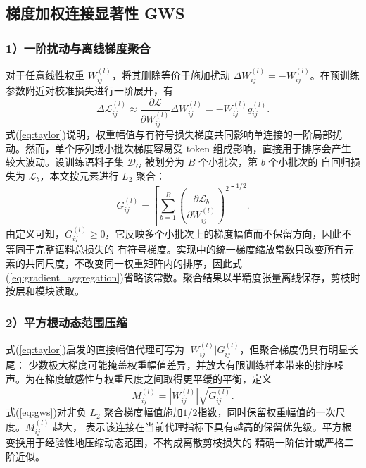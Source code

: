 \documentclass[UTF8,fontset=fandol]{ctexart}
\begin{document}
\subsection{梯度加权连接显著性 GWS}

\subsubsection*{1）一阶扰动与离线梯度聚合}

对于任意线性权重 $W_{ij}^{(l)}$，将其删除等价于施加扰动
$\Delta W_{ij}^{(l)}=-W_{ij}^{(l)}$。在预训练参数附近对校准损失进行一阶展开，有
\begin{equation}
\Delta\mathcal L_{ij}^{(l)}
\approx
\frac{\partial\mathcal L}{\partial W_{ij}^{(l)}}
\Delta W_{ij}^{(l)}
=-W_{ij}^{(l)}g_{ij}^{(l)} .
\label{eq:taylor}
\end{equation}
式(\ref{eq:taylor})说明，权重幅值与有符号损失梯度共同影响单连接的一阶局部扰动。然而，单个序列或小批次梯度容易受
token 组成影响，直接用于排序会产生较大波动。设训练语料子集 $\mathcal D_G$ 被划分为 $B$ 个小批次，第 $b$ 个小批次的
自回归损失为 $\mathcal L_b$，本文按元素进行 $L_2$ 聚合：
\begin{equation}
G_{ij}^{(l)}
=
\left[
\sum_{b=1}^{B}
\left(
\frac{\partial\mathcal L_b}{\partial W_{ij}^{(l)}}
\right)^2
\right]^{1/2}.
\label{eq:gradient_aggregation}
\end{equation}
由定义可知，$G_{ij}^{(l)}\geq0$，它反映多个小批次上的梯度幅值而不保留方向，因此不等同于完整语料总损失的
有符号梯度。实现中的统一梯度缩放常数只改变所有元素的共同尺度，不改变同一权重矩阵内的排序，因此式
(\ref{eq:gradient_aggregation})省略该常数。聚合结果以半精度张量离线保存，剪枝时按层和模块读取。

\subsubsection*{2）平方根动态范围压缩}

式(\ref{eq:taylor})启发的直接幅值代理可写为 $\lvert W_{ij}^{(l)}\rvert G_{ij}^{(l)}$，但聚合梯度仍具有明显长尾：
少数极大梯度可能掩盖权重幅值差异，并放大有限训练样本带来的排序噪声。为在梯度敏感性与权重尺度之间取得更平缓的平衡，定义
\begin{equation}
M_{ij}^{(l)}
=
\left|W_{ij}^{(l)}\right|
\sqrt{G_{ij}^{(l)}}.
\label{eq:gws}
\end{equation}
式(\ref{eq:gws})对非负 $L_2$ 聚合梯度幅值施加$1/2$指数，同时保留权重幅值的一次尺度。$M_{ij}^{(l)}$ 越大，
表示该连接在当前代理指标下具有越高的保留优先级。平方根变换用于经验性地压缩动态范围，不构成离散剪枝损失的
精确一阶估计或严格二阶近似。
\end{document}
